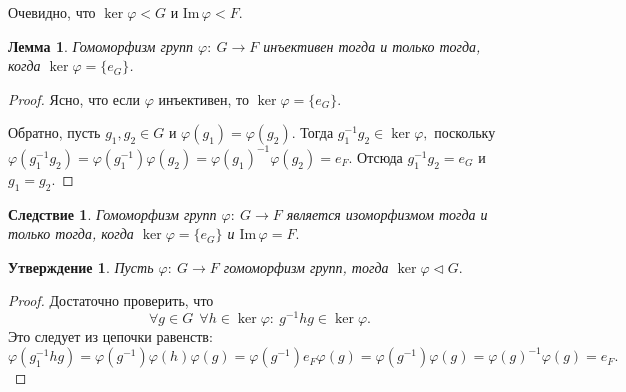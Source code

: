 \documentclass[a4paper, 14pt]{extarticle}
\newcommand{\n}{\par}
\newcommand{\im}{\mathrm{Im} \,}
\renewcommand{\phi}{\varphi}
\theoremstyle{definition}
\theoremstyle{plain}
\numberwithin{theorem}{section}
\numberwithin{definition}{section}
\newtheorem*{statement*}{Утверждение}
\numberwithin{statement}{section}
\newtheorem*{lemma*}{Лемма}
\numberwithin{lemma}{section}
\newtheorem*{consequence*}{Следствие}
\numberwithin{consequence}{section}
\begin{document}
	Очевидно, что $\ker \phi < G$ и Im$\, \phi < F.$
	\begin{lemma*}
		Гомоморфизм групп ${\phi{:} \ G \rightarrow F}$ инъективен тогда и только тогда, когда  $\ker \phi = \{e_G\}$.
	\end{lemma*}
	\begin{proof}
		Ясно, что если $\phi$ инъективен, то $\ker \phi = \{e_G\}.$ \n
		Обратно, пусть ${g_1, g_2 \in G}$ и ${\phi(g_1) = \phi(g_2).}$ Тогда ${g^{-1}_1g_2 \in \ker \phi,}$ поскольку ${\phi(g^{-1}_1g_2) = \phi(g^{-1}_1) \phi(g_2) = \phi(g_1)^{-1} \phi(g_2) = e_F.}$ Отсюда $g^{-1}_1g_2 = e_G$ и $g_1 = g_2.$
	\end{proof}
	\begin{consequence*}
		Гомоморфизм групп ${\phi{:} \ G \rightarrow F}$ является изоморфизмом тогда и только тогда, когда ${\ker \phi = \{e_G\}}$ и ${\im \phi = F.}$
	\end{consequence*}
	\begin{statement*}
		Пусть ${\phi{:} \ G \rightarrow F}$ гомоморфизм групп, тогда $\ker \phi \lhd G.$
	\end{statement*}
	\begin{proof}
		Достаточно проверить, что
		\begin{equation*}
			\forall g \in G \ \ \forall h \in \ker \phi{:} \ g^{-1}hg \in \ker \phi.
		\end{equation*}
		Это следует из цепочки равенств:
		\begin{equation*}
			\phi(g^{-1}_1hg) = \phi(g^{-1}) \phi(h) \phi(g) = \phi(g^{-1}) e_F \phi(g) = \phi(g^{-1}) \phi(g) = \phi(g)^{-1} \phi(g) = e_F.
		\end{equation*}
	\end{proof}
	\newpage
\end{document}
